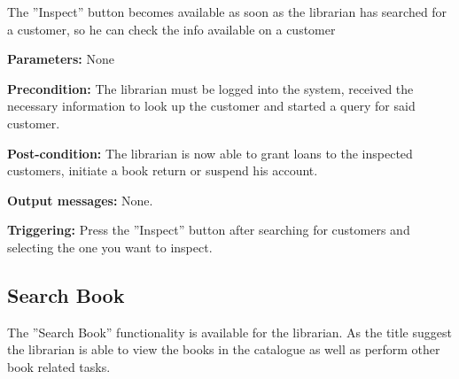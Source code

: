 The ''Inspect'' button becomes available as soon as the librarian has searched
for a customer, so he can check the info available on a customer

\begin{description}

\item \textbf{Parameters:} None

\item \textbf{Precondition:} The librarian must be logged into the system,
received the necessary information to look up the customer and started a query
for said customer.

\item \textbf{Post-condition:} The librarian is now able to grant loans to the
inspected customers, initiate a book return or suspend his account.

\item \textbf{Output messages:} None.

\item \textbf{Triggering:} Press the ''Inspect'' button after searching for
customers and selecting the one you want to inspect.

\end{description}

\subsection{Search Book}

The ''Search Book'' functionality is available for the librarian. As the title
suggest the librarian is able to view the books in the catalogue as well as
perform other book related tasks.

